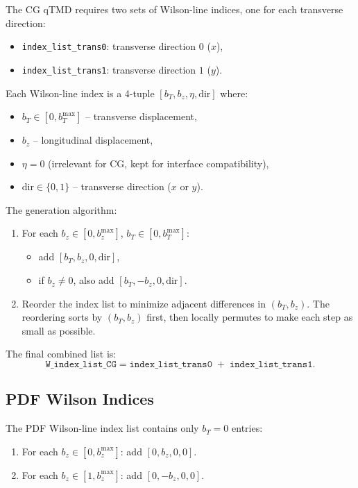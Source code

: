 \documentclass[11pt,a4paper]{article}
\begin{document}
The CG qTMD requires two sets of Wilson-line indices, one for each transverse direction:

\begin{itemize}
  \item \texttt{index\_list\_trans0}: transverse direction $0$ ($x$),
  \item \texttt{index\_list\_trans1}: transverse direction $1$ ($y$).
\end{itemize}

Each Wilson-line index is a 4-tuple $[b_T, b_z, \eta, \text{dir}]$ where:
\begin{itemize}
  \item $b_T \in [0, b_T^{\max}]$ -- transverse displacement,
  \item $b_z$ -- longitudinal displacement,
  \item $\eta = 0$ (irrelevant for CG, kept for interface compatibility),
  \item $\text{dir} \in \{0, 1\}$ -- transverse direction ($x$ or $y$).
\end{itemize}

The generation algorithm:
\begin{enumerate}
  \item For each $b_z \in [0, b_z^{\max}]$, $b_T \in [0, b_T^{\max}]$:
    \begin{itemize}
      \item add $[b_T, b_z, 0, \text{dir}]$,
      \item if $b_z \neq 0$, also add $[b_T, -b_z, 0, \text{dir}]$.
    \end{itemize}
  \item Reorder the index list to minimize adjacent differences in $(b_T, b_z)$.
    The reordering sorts by $(b_T, b_z)$ first, then locally permutes to make each
    step as small as possible.
\end{enumerate}

The final combined list is:
\begin{equation}
  \texttt{W\_index\_list\_CG} =
    \texttt{index\_list\_trans0} \;+\; \texttt{index\_list\_trans1}.
\end{equation}

\subsection{PDF Wilson Indices}

The PDF Wilson-line index list contains only $b_T = 0$ entries:
\begin{enumerate}
  \item For each $b_z \in [0, b_z^{\max}]$: add $[0, b_z, 0, 0]$.
  \item For each $b_z \in [1, b_z^{\max}]$: add $[0, -b_z, 0, 0]$.
\end{enumerate}
\end{document}
